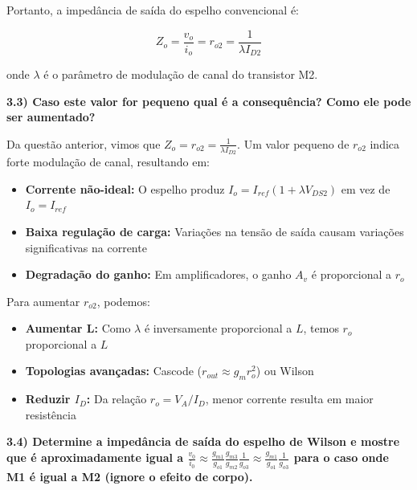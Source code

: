 ﻿\documentclass[12pt,a4paper]{article}
\begin{document}
Portanto, a impedância de saída do espelho convencional é:

\begin{equation}
Z_o = \frac{v_o}{i_o} = r_{o2} = \frac{1}{\lambda I_{D2}}
\end{equation}

onde $\lambda$ é o parâmetro de modulação de canal do transistor M2.

\textbf{3.3) Caso este valor for pequeno qual é a consequência? Como ele pode ser aumentado?}

Da questão anterior, vimos que $Z_o = r_{o2} = \frac{1}{\lambda I_{D2}}$. Um valor pequeno de $r_{o2}$ indica forte modulação de canal, resultando em:

\begin{itemize}
    \item \textbf{Corrente não-ideal:} O espelho produz $I_o = I_{ref}(1 + \lambda V_{DS2})$ em vez de $I_o = I_{ref}$
    \item \textbf{Baixa regulação de carga:} Variações na tensão de saída causam variações significativas na corrente
    \item \textbf{Degradação do ganho:} Em amplificadores, o ganho $A_v$ é proporcional a $r_o$
\end{itemize}

Para aumentar $r_{o2}$, podemos:

\begin{itemize}
    \item \textbf{Aumentar L:} Como $\lambda$ é inversamente proporcional a $L$, temos $r_o$ proporcional a $L$
    \item \textbf{Topologias avançadas:} Cascode ($r_{out} \approx g_m r_o^2$) ou Wilson
    \item \textbf{Reduzir $I_D$:} Da relação $r_o = V_A/I_D$, menor corrente resulta em maior resistência
\end{itemize}

\textbf{3.4) Determine a impedância de saída do espelho de Wilson e mostre que é aproximadamente igual a $\frac{v_{0}}{i_{0}} \approx \frac{g_{m1}}{g_{o1}} \frac{g_{m3}}{g_{m2}} \frac{1}{g_{o3}} \approx \frac{g_{m1}}{g_{o1}} \frac{1}{g_{o3}}$ para o caso onde M1 é igual a M2 (ignore o efeito de corpo).}
\end{document}

